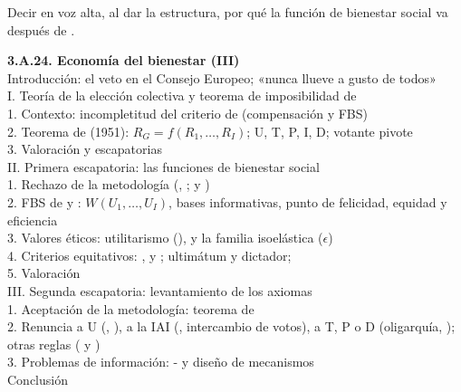 \documentclass[11pt]{article}
\begin{document}
\begin{notaopositor}
Decir en voz alta, al dar la estructura, por qué la función de bienestar social va después de .
\end{notaopositor}

\begin{esquema}
\textbf{3.A.24. Economía del bienestar (III)}\\[2pt]
Introducción: el veto en el Consejo Europeo; «nunca llueve a gusto de todos»\\
I. Teoría de la elección colectiva y teorema de imposibilidad de \\
\hspace*{1.5em}1. Contexto: incompletitud del criterio de  (compensación y FBS)\\
\hspace*{1.5em}2. Teorema de  (1951): $R_G=f(R_1,\dots,R_I)$; U, T, P, I, D; votante pivote\\
\hspace*{1.5em}3. Valoración y escapatorias\\
II. Primera escapatoria: las funciones de bienestar social\\
\hspace*{1.5em}1. Rechazo de la metodología (, ;  y )\\
\hspace*{1.5em}2. FBS de  y : $W(U_1,\dots,U_I)$, bases informativas, punto de felicidad, equidad y eficiencia\\
\hspace*{1.5em}3. Valores éticos: utilitarismo (),  y la familia isoelástica ($\epsilon$)\\
\hspace*{1.5em}4. Criterios equitativos: ,  y ; ultimátum y dictador; \\
\hspace*{1.5em}5. Valoración\\
III. Segunda escapatoria: levantamiento de los axiomas\\
\hspace*{1.5em}1. Aceptación de la metodología: teorema de \\
\hspace*{1.5em}2. Renuncia a U (, ), a la IAI (, intercambio de votos), a T, P o D (oligarquía, ); otras reglas ( y )\\
\hspace*{1.5em}3. Problemas de información: - y diseño de mecanismos\\
Conclusión
\end{esquema}
\end{document}
